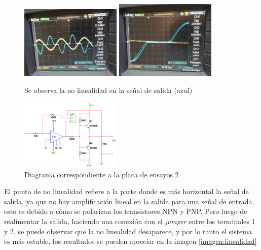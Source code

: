 \documentclass[letterpaper, 10 pt, conference]{ieeeconf}  %
\begin{document}
\begin{figure}[H]
   \centering
   \includegraphics[width=0.43\textwidth]{./nolinealidad2.jpeg}
   \includegraphics[width=0.43\textwidth]{./nolinealidad.jpeg}
   \caption{Se observa la no linealidad en la señal de salida (azul)}
   \label{imagen:nolinealidad}
 \end{figure}

\begin{figure}[H]
   \centering
   \includegraphics[width=0.43\textwidth]{./diagramaPlaca2.png}
   \caption{Diagrama correspondiente a la placa de ensayos 2}
   \label{diagramaPlaca2}
 \end{figure}

 El punto de no linealidad refiere a la parte donde es más horizontal la señal de salida, ya que no hay amplificación lineal en la salida para una señal de entrada, esto es debido a cómo se polarizan los transistores NPN y PNP. Pero luego de realimentar la salida, haciendo una conexión con el \textit{jumper} entre los terminales 1 y 2, se puede observar que la no linealidad desaparece, y por lo tanto el sistema es más estable, los resultados se pueden apreciar en la imagen \ref{imagen:linealidad}
\end{document}
